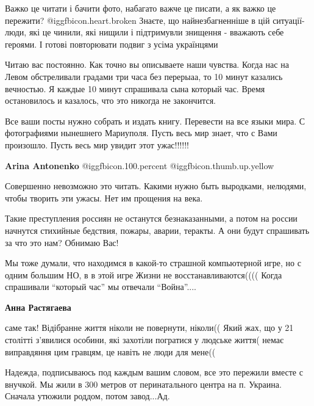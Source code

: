 \begin{itemize}
\begin{itemize}
\end{itemize} %


Важко це читати і бачити фото, набагато важче це писати, а як важко це
пережити?  @igg{fbicon.heart.broken}  Знаєте, що найнезбагненніше в цій ситуації- люди, які це чинили,
які нищили і підтримувли знищення - вважають себе героями. І готові повторювати
подвиг з усіма українцями


Читаю вас постоянно. Как точно вы описываете наши чувства. Когда нас на Левом
обстреливали градами три часа без перерыаа, то 10 минут казались вечностью. Я
каждые 10 минут спрашивала сына который час. Время остановилось и казалось, что
это никогда не закончится.


Все ваши посты нужно собрать и издать книгу. Перевести на все языки мира. С
фотографиями нынешнего Мариуполя. Пусть весь мир знает, что с Вами произошло.
Пусть весь мир увидит этот ужас!!!!!!

\textbf{Arina Antonenko}  @igg{fbicon.100.percent}  @igg{fbicon.thumb.up.yellow} 

Совершенно невозможно это читать. Какими нужно быть выродками, нелюдями, чтобы творить эти ужасы. Нет им прощения на века.


Такие преступления россиян не останутся безнаказанными, а потом на россии
начнутся стихийные бедствия, пожары, аварии, теракты. А они будут спрашивать за
что это нам? Обнимаю Вас!


Мы тоже думали, что находимся в какой-то страшной компьютерной игре, но с одним
большим НО, в в этой игре Жизни не восстанавливаются(((( Когда спрашивали
\enquote{который час} мы отвечали \enquote{Война}....

\textbf{Анна Растягаева} 

саме так! Відібранне життя ніколи не повернути, ніколи(( Який жах, що у 21
столітті з'явилися особини, які захотіли погратися у людське життя( немає
виправдяння цим гравцям, це навіть не люди для мене((


Надежда, подписываюсь под каждым вашим словом, все это пережили вместе с
внучкой. Мы жили в 300 метров от перинатального центра на п. Украина. Сначала
утюжили роддом, потом завод...Ад.


\end{itemize}
